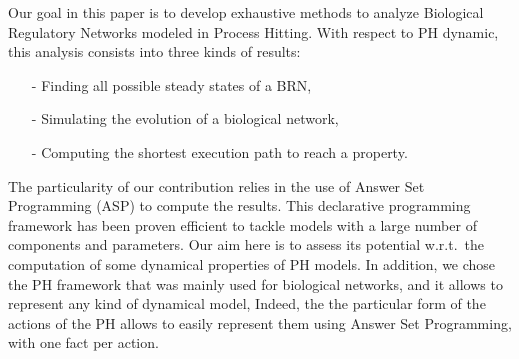 Our goal in this paper is to develop exhaustive methods to analyze Biological Regulatory Networks modeled in Process Hitting. With respect to PH dynamic, this analysis consists into three kinds of results:
\begin{itemize}
\item[-] Finding all possible steady states of a BRN,
\item[-] Simulating the evolution of a biological network,
\item[-] Computing the shortest execution path to reach a property.
\end{itemize}

 The particularity of our contribution relies in the use of Answer Set Programming
(ASP) \cite{baral2003knowledge}
to compute the results.
This declarative programming framework has been proven efficient
to tackle models with a large number of components and parameters.
Our aim here is to assess its potential w.r.t.\ the computation
of some dynamical properties of PH models. In addition, we chose the PH framework that was mainly used for biological networks, and it allows to represent any kind of dynamical model,
Indeed, the the particular form of the actions of the PH allows
to easily represent them using Answer Set Programming,
with one fact per action.
